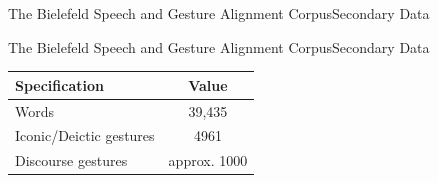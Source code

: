 \documentclass{beamer}
\begin{document}
				\begin{frame}{The Bielefeld Speech and Gesture Alignment Corpus}{Secondary Data}
					\begin{figure}
				\end{figure}
				\end{frame}
			
				\begin{frame}{The Bielefeld Speech and Gesture Alignment Corpus}{Secondary Data}
					\begin{table}
						\center
						\begin{tabular}{|l|c|}
							\hline
							\textbf{Specification} & \textbf{Value} \\ 
							\hline 
							Words & 39,435 \\ 
							\hline 
							Iconic/Deictic gestures & 4961 \\ 
							\hline 
							Discourse gestures & approx. 1000 \\ 
							\hline 
						\end{tabular}
					\end{table}
				\end{frame}
		
\end{document}
